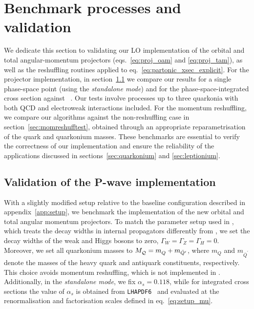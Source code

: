 \section{Benchmark processes and validation}\label{sec:benchmark}

We dedicate this section to validating our LO implementation of the orbital and total angular-momentum projectors (eqs.~\eqref{eq:proj_oam} and \eqref{eq:proj_tam}), as well as the reshuffling routines {applied to eq.~\eqref{eq:partonic_xsec_explicit}.} For the projector implementation, in section~\ref{sec:Pwavetest} we compare our results for a single phase-space point (using the \textit{standalone mode}) and for the phase-space-integrated cross section against \helaconia~\cite{Shao:2012iz,Shao:2015vga}. Our tests involve processes up to three {\pwavetxt} quarkonia with both QCD and electroweak interactions included.
For the momentum reshuffling, we compare our algorithms against the non-reshuffling case in section~\ref{sec:momreshufftest}, obtained through an appropriate reparametrisation of the quark and quarkonium masses.
These benchmarks are essential to verify the correctness of our implementation and ensure the reliability of the applications discussed in sections~\ref{sec:quarkonium} and \ref{sec:leptionium}.

\subsection{Validation of the P-wave implementation}
\label{sec:Pwavetest}
With a slightly modified setup relative to the baseline configuration described in appendix~\ref{app:setup}, we benchmark the implementation of the new orbital and total angular momentum projectors. To match the parameter setup used in \helaconia{}, which treats the decay widths in internal propagators differently from \mgshort, we set the decay widths of the weak and Higgs bosons to zero, ${\Gamma_W = \Gamma_Z = \Gamma_H = 0}$. Moreover, we set all quarkonium masses to $M_{\cal Q}^{\phantom{2}}=m_{Q}^{\phantom{2}}+m_{\bar{Q}^\prime}$, where $m_{Q}^{\phantom{2}}$ and $m_{\bar{Q}^\prime}$ denote the masses of the heavy quark and antiquark constituents, respectively. This choice avoids momentum reshuffling, which is not implemented in \helaconia{}. Additionally, in the \textit{standalone mode}, we fix $\alpha_s=0.118$, while for integrated cross sections the value of $\alpha_s$ is obtained from {\tt LHAPDF6}~\cite{Buckley:2014ana} and evaluated at the renormalisation and factorisation scales defined in eq.~\eqref{eq:setup_mu}.

